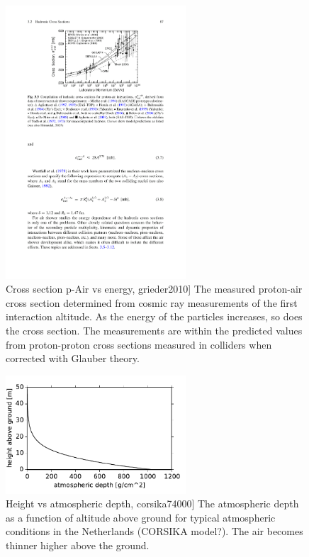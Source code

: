 \begin{figure}
    \centering
    \includegraphics[width=0.6\textwidth]
                    {plots/cosmic-rays/pair_crosssection}
    \caption{Cross section p-Air vs energy, grieder2010]
The measured proton-air cross section determined from cosmic ray measurements of the first interaction altitude. As the energy of the particles increases, so does the cross section. The measurements are within the predicted values from proton-proton cross sections measured in colliders when corrected with Glauber theory.}
    \label{fig:pair_crosssection}
\end{figure}


\begin{figure}
    \centering
    \includegraphics[width=0.6\textwidth]
                    {plots/cosmic-rays/atmospheric_depth}
    \caption{Height vs atmospheric depth, corsika74000]
The atmospheric depth as a function of altitude above ground for typical atmospheric conditions in the Netherlands (CORSIKA model?). The air becomes thinner higher above the ground.}
    \label{fig:atmospheric_depth}
\end{figure}

